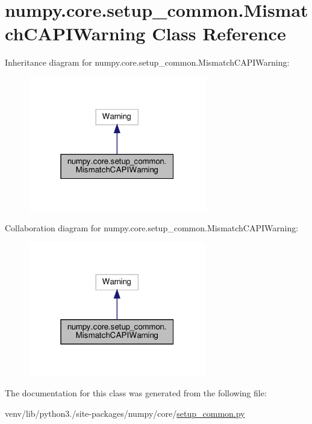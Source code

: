 \hypertarget{classnumpy_1_1core_1_1setup__common_1_1MismatchCAPIWarning}{}\section{numpy.\+core.\+setup\+\_\+common.\+Mismatch\+C\+A\+P\+I\+Warning Class Reference}
\label{classnumpy_1_1core_1_1setup__common_1_1MismatchCAPIWarning}


Inheritance diagram for numpy.\+core.\+setup\+\_\+common.\+Mismatch\+C\+A\+P\+I\+Warning\+:
\nopagebreak
\begin{figure}[H]
\begin{center}
\leavevmode
\includegraphics[width=220pt]{classnumpy_1_1core_1_1setup__common_1_1MismatchCAPIWarning__inherit__graph}
\end{center}
\end{figure}


Collaboration diagram for numpy.\+core.\+setup\+\_\+common.\+Mismatch\+C\+A\+P\+I\+Warning\+:
\nopagebreak
\begin{figure}[H]
\begin{center}
\leavevmode
\includegraphics[width=220pt]{classnumpy_1_1core_1_1setup__common_1_1MismatchCAPIWarning__coll__graph}
\end{center}
\end{figure}


The documentation for this class was generated from the following file\+:\begin{DoxyCompactItemize}
\item 
venv/lib/python3./site-\/packages/numpy/core/\hyperlink{setup__common_8py}{setup\+\_\+common.\+py}\end{DoxyCompactItemize}
